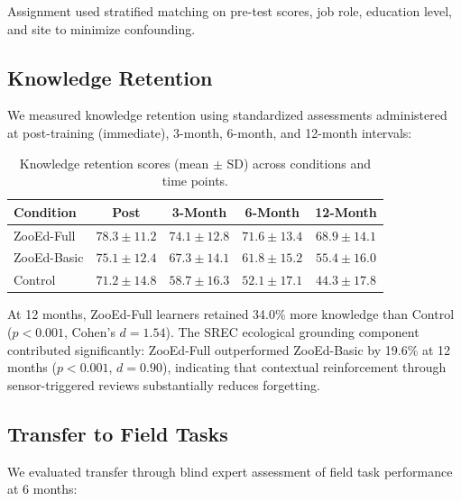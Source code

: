 Assignment used stratified matching on pre-test scores, job role, education level, and site to minimize confounding.

\subsection{Knowledge Retention}

We measured knowledge retention using standardized assessments administered at post-training (immediate), 3-month, 6-month, and 12-month intervals:

\begin{table}[H]
\centering
\caption{Knowledge retention scores (mean $\pm$ SD) across conditions and time points.}
\label{tab:retention}
\begin{tabular}{@{}lcccc@{}}
\toprule
\textbf{Condition} & \textbf{Post} & \textbf{3-Month} & \textbf{6-Month} & \textbf{12-Month} \\
\midrule
ZooEd-Full & $78.3 \pm 11.2$ & $74.1 \pm 12.8$ & $71.6 \pm 13.4$ & $68.9 \pm 14.1$ \\
ZooEd-Basic & $75.1 \pm 12.4$ & $67.3 \pm 14.1$ & $61.8 \pm 15.2$ & $55.4 \pm 16.0$ \\
Control & $71.2 \pm 14.8$ & $58.7 \pm 16.3$ & $52.1 \pm 17.1$ & $44.3 \pm 17.8$ \\
\bottomrule
\end{tabular}
\end{table}

At 12 months, ZooEd-Full learners retained 34.0\% more knowledge than Control ($p < 0.001$, Cohen's $d = 1.54$).
The SREC ecological grounding component contributed significantly: ZooEd-Full outperformed ZooEd-Basic by 19.6\% at 12 months ($p < 0.001$, $d = 0.90$), indicating that contextual reinforcement through sensor-triggered reviews substantially reduces forgetting.

\subsection{Transfer to Field Tasks}

We evaluated transfer through blind expert assessment of field task performance at 6 months:

